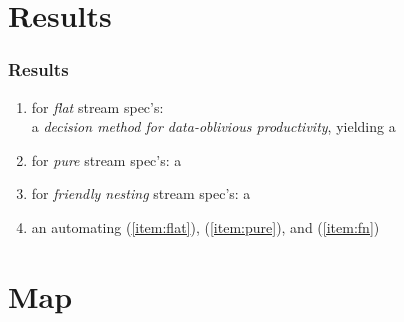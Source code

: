 \documentclass[10pt]{beamer}
\begin{document}
\section{Results}


\begin{frame}%
  \frametitle{Results}

\begin{enumerate}
  \item \label{item:flat}
    for \emph{flat} stream spec's:\\ a 
    \emph{decision method for data-oblivious productivity},
    yielding a
    \vspace*{0.15ex}
  \item \label{item:pure}
    for \emph{pure} stream spec's: 
    a  
    \vspace*{0.15ex}
  \item \label{item:fn}
    for \emph{friendly nesting} stream spec's: 
    a 
    \vspace*{0.15ex}
  \item an  automating (\ref{item:flat}),
    (\ref{item:pure}), and (\ref{item:fn}) 
\end{enumerate}

\vspace*{-0.75ex}
%
\begin{center}
\end{center}

\end{frame}%

\section{Map}
\end{document}
